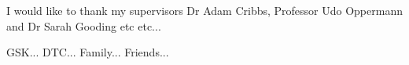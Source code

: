 I would like to thank my supervisors Dr Adam Cribbs, Professor Udo Oppermann and Dr Sarah Gooding etc etc...

GSK...
DTC...
Family...
Friends...



